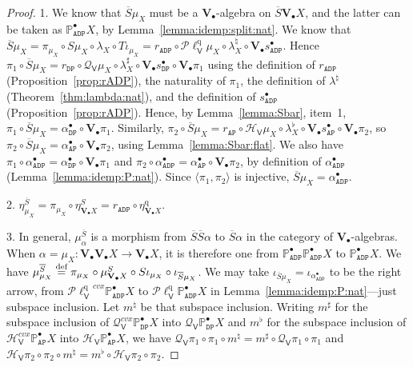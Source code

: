 \documentclass[preprint,12pt]{elsarticle}
\newcommand\eqdef{\mathrel{\buildrel \text{def}\over=}}
\newcommand\Pred{\mathbb{P}}
\newcommand\Angel{{\mathtt{A}}}
\newcommand\Demon{{\mathtt{D}}}
\newcommand\Nature{{\mathtt{P}}}
\newcommand\AN{{\Angel\Nature}}
\newcommand\DN{{\Demon\Nature}}
\newcommand\ADN{{\Angel\Demon\Nature}}
\newcommand\Smyth{{\mathcal Q}}
\newcommand\Hoare{{\mathcal H}}
\newcommand\Vt{\mathsf{V}}
\newcommand\HV{\Hoare_\Vt}
\newcommand\SV{\Smyth_{\Vt}}
\newcommand\quasi{\mathrm{q}} %
\newcommand\QL{\Plotkin^\quasi}
\newcommand\QLV{\QL_\Vt}
\newcommand\Plotkin{\mathcal P\ell} %
\newcommand\Val{{\mathbf V}}
\begin{document}
\begin{proof}
  1.  We know that $\overline S \mu_X$ must be a
  $\Val_\bullet$-algebra on $\overline S {\Val_\bullet X}$, and the
  latter can be taken as $\Pred_\ADN^\bullet X$, by
  Lemma~\ref{lemma:idemp:split:nat}.  We know that
  $\overline S \mu_X = \pi_{\mu_X} \circ S \mu_X \circ \lambda_X \circ
  T\iota_{\mu_X} = r_\ADN \circ \QLV \mu_X \circ {\lambda^\natural_X}
  \circ \Val_\bullet {s_\ADN^\bullet}$.  Hence
  $\pi_1 \circ \overline S \mu_X = r_\DN \circ \SV \mu_X \circ
  \lambda^\sharp_X \circ \Val_\bullet {s_\DN^\bullet} \circ
  \Val_\bullet {\pi_1}$ using the definition of $r_\ADN$
  (Proposition~\ref{prop:rADP}), the naturality of $\pi_1$, the
  definition of $\lambda^\natural$ (Theorem~\ref{thm:lambda:nat}), and
  the definition of $s_\ADN^\bullet$ (Proposition~\ref{prop:rADP}).
  Hence, by Lemma~\ref{lemma:Sbar}, item~1,
  $\pi_1 \circ \overline S \mu_X = \alpha_\DN^\bullet \circ
  \Val_\bullet {\pi_1}$.  Similarly,
  $\pi_2 \circ \overline S \mu_X = r_\AN \circ \HV \mu_X \circ
  \lambda^\flat_X \circ \Val_\bullet {s_\AN^\bullet} \circ
  \Val_\bullet {\pi_2}$, so
  $\pi_2 \circ \overline S \mu_X = \alpha_\AN^\bullet \circ
  \Val_\bullet {\pi_2}$, using Lemma~\ref{lemma:Sbar:flat}.  We also
  have
  $\pi_1 \circ \alpha_\ADN^\bullet = \alpha_\DN^\bullet \circ
  \Val_\bullet {\pi_1}$ and
  $\pi_2 \circ \alpha_\ADN^\bullet = \alpha_\AN^\bullet \circ
  \Val_\bullet {\pi_2}$, by definition of $\alpha_\ADN^\bullet$
  (Lemma~\ref{lemma:idemp:P:nat}).  Since
  $\langle \pi_1, \pi_2 \rangle$ is injective,
  $\overline S \mu_X = \alpha_\ADN^\bullet$.
  
  2.
  $\eta^{\overline S}_{\mu_X} = \pi_{\mu_X} \circ \eta^S_{\Val_\bullet
    X} = r_\ADN \circ \eta^\quasi_{\Val_\bullet X}$.

  3. In general, $\mu^{\overline S}_\alpha$ is a morphism from
  $\overline S {\overline S \alpha}$ to $\overline S \alpha$ in the
  category of $\Val_\bullet$-algebras.  When
  $\alpha = \mu_X \colon \Val_\bullet {\Val_\bullet X} \to
  \Val_\bullet X$, it is therefore one from
  $\Pred_\ADN^\bullet {\Pred_\ADN^\bullet X}$ to
  $\Pred_\ADN^\bullet X$.  We have
  $\mu^{\overline S}_{\mu_X} \eqdef \pi_{\mu_X} \circ
  \mu^S_{\Val_\bullet X} \circ S \iota_{\mu_X} \circ \iota_{\overline
    S \mu_X}$.  We may take
  $\iota_{\overline S \mu_X} = \iota_{\alpha_\ADN^\bullet}$ to be the
  right arrow, from ${\QLV}^{cvx} {\Pred_\ADN^\bullet X}$ to
  $\QLV {\Pred_\ADN^\bullet X}$ in
  Lemma~\ref{lemma:idemp:P:nat}---just subspace inclusion.  Let
  $m^\natural$ be that subspace inclusion.  Writing $m^\sharp$ for the
  subspace inclusion of $\SV^{cvx} {\Pred_\DN^\bullet X}$ into
  $\SV {\Pred_\DN^\bullet X}$ and $m^\flat$ for the subspace inclusion
  of $\HV^{cvx} {\Pred_\AN^\bullet X}$ into
  $\HV {\Pred_\AN^\bullet X}$, we have
  $\SV {\pi_1} \circ \pi_1 \circ m^\natural = m^\sharp \circ \SV
  {\pi_1} \circ \pi_1$ and
  $\HV {\pi_2} \circ \pi_2 \circ m^\natural = m^\flat \circ \HV
  {\pi_2} \circ \pi_2$.
  

\end{proof}
\end{document}
